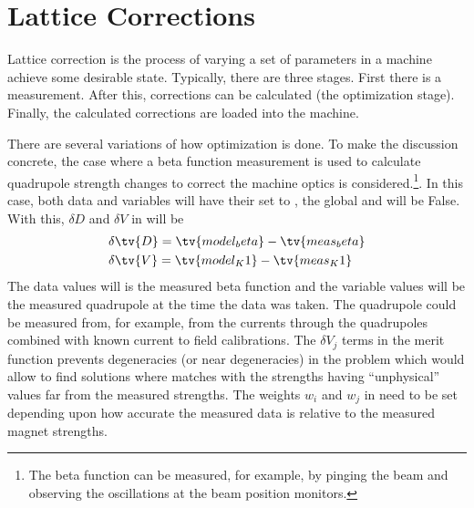{{{%
\section{Lattice Corrections}
\label{s:lat.correction}

Lattice correction is the process of varying a set of parameters in a machine achieve some desirable
state.  Typically, there are three stages. First there is a measurement. After this, corrections can
be calculated (the optimization stage). Finally, the calculated corrections are loaded into the
machine.

There are several variations of how optimization is done. To make the discussion concrete, the
case where a beta function measurement is used to calculate quadrupole  strength changes to
correct the machine optics is considered.\footnote
  { 
The beta function can be measured, for example, by pinging the
beam and observing the oscillations at the beam position monitors.
  }.
In this case, both data and variables will have their  set to , the
global  and  will be False. With this, $\delta D$ and $\delta V$
in  will be
\begin{align}
  \delta &\tv{D} = \tv{model_beta} - \tv{meas_beta} \CRNO
  \delta &\tv{V} = \tv{model_K1} - \tv{meas_K1}
  \label{dd1}
\end{align}
The  data values will is the measured beta function and the variable 
values will be the measured quadrupole  at the time the data was taken. The quadrupole
 could be measured from, for example, from the currents through the quadrupoles combined with
known current to field calibrations. The $\delta V_j$ terms in the merit function prevents
degeneracies (or near degeneracies) in the problem which would allow \tao to find solutions where
 matches  with the  strengths having ``unphysical'' values
far from the measured strengths. The weights $w_i$ and $w_j$ in  need to be set depending
upon how accurate the measured data is relative to the measured magnet strengths.

}}}
